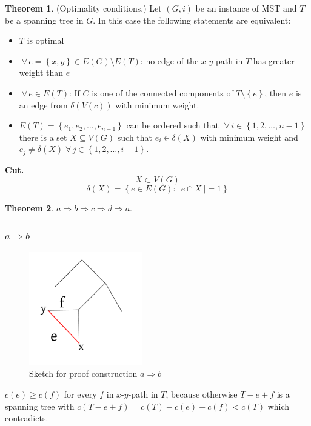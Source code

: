 \documentclass[a4paper]{article}
\theoremstyle{definition}
\newtheorem{theorem}{Theorem}
\newcommand{\card}[1]{\left|\:\!#1\:\!\right|}
\newcommand{\set}[1]{\left\{#1\right\}}
\newcommand{\gath}[2]{$#1$-$#2$-path} %
\newcommand{\fall}{\;\forall\,}
\begin{document}
\begin{theorem}\label{satz-2.2}
(Optimality conditions.)
Let $(G, i)$ be an instance of MST and $T$ be a spanning tree in $G$. In this case the following statements are equivalent:
\begin{itemize}
  \item $T$ is optimal
  \item $\fall e = \set{x, y} \in E(G) \setminus E(T)$: no edge of the \gath xy in $T$ has greater weight than $e$
  \item $\fall e \in E(T)$: If $C$ is one of the connected components of $T \setminus \set{e}$, then $e$ is an edge from $\delta(V(c))$ with minimum weight.
  \item $E(T) = \set{e_1, e_2, \ldots, e_{n-1}}$ can be ordered such that $\fall i \in \set{1, 2, \ldots, n-1}$ there is a set $X \subseteq V(G)$ such that $e_i \in \delta(X)$ with minimum weight and $e_j \neq \delta(X) \fall j \in \set{1, 2, \ldots, i-1}$.
\end{itemize}
\end{theorem}

\textbf{Cut.}
\[
  X \subset V(G)
\] \[
  \delta(X) = \set{e \in E(G): \card{e \cap X} = 1}
\]

\begin{theorem}
  $a \Rightarrow b \Rightarrow c \Rightarrow d \Rightarrow a$.
\end{theorem}

\subsubsection{$a \Rightarrow b$}
%
\begin{figure}[t]
  \begin{center}
    \includegraphics[width=140pt]{img/ab.pdf}
    \caption{Sketch for proof construction $a \Rightarrow b$}
  \end{center}
\end{figure}

$c(e) \geq c(f)$
for every $f$ in \gath xy in $T$, because otherwise $T - e + f$ is a spanning tree with $c(T - e  + f) = c(T) - c(e) + c(f) < c(T)$ which contradicts.
\end{document}
